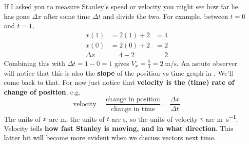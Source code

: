 \documentclass{tufte-handout}
\begin{document}
If I asked you to measure Stanley's speed or velocity you might see how far he has gone $\Delta x$ after some time $\Delta t$ and divide the two. For example, between $t=0$ and $t=1$,
\begin{align}
x(1) &= 2(1)+2 &= 4 \\
x(0) &= 2(0)+2 &= 2 \\
\Delta x &= 4 - 2 &= 2
\end{align}
Combining this with $\Delta t = 1-0 = 1$ gives $V_x=\frac{2}{1}=\SI{2}{\meter\per\second}$. An astute observer will notice that this is also the \textbf{slope} of the position vs time graph in . We'll come back to that.  For now just notice that \textbf{velocity is the (time) rate of change of position}, e.g.
\begin{equation}
\text{velocity} = \dfrac{\text{change in position}}{\text{change in time}} = \dfrac{\Delta x}{\Delta t}
\end{equation}
The units of $x$ are \si{\meter}, the units of $t$ are \si{\second}, so the units of velocity $v$ are \si{\meter\per\second}. Velocity tells \textbf{how fast Stanley is moving, and in what direction}. This latter bit will become more evident when we discuss vectors next time. 
\end{document}
